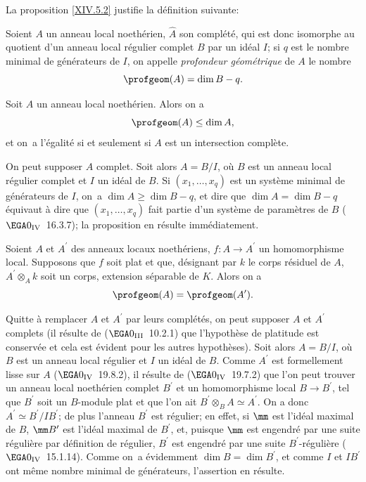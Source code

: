 La proposition \ref{XIV.5.2} justifie la d\'efinition suivante:

\begin{definition} \label{XIV.5.3}
Soient $A$ un anneau local noeth\'erien, $\widehat{A}$ son compl\'et\'e, qui est donc isomorphe au quotient d'un anneau local r\'egulier complet $B$ par un id\'eal $I$; si $q$ est le nombre minimal de g\'en\'erateurs de $I$, on appelle \emph{profondeur géométrique} de $A$ le nombre
$$
\profgeom(A)=\dim B-q.
$$
\end{definition}

\begin{proposition} \label{XIV.5.4} Soit $A$ un anneau local noeth\'erien. Alors on a
$$
\profgeom(A)\leq\dim A,
$$
et on~a l'\'egalit\'e si et seulement si $A$ est un intersection compl\`ete.
\end{proposition}

On peut supposer $A$ complet. Soit alors $A=B/I$, o\`u $B$ est un anneau local r\'egulier complet et $I$ un id\'eal de $B$. Si $(x_{1},\dots, x_{q})$ est un syst\`eme minimal de g\'en\'erateurs de $I$, on~a $\dim A\geq\dim B-q$, et dire que $\dim A=\dim B-q$ \'equivaut \`a dire que $(x_{1},\dots, x_{q})$ fait partie d'un syst\`eme de param\`etres de $B$ ($\EGA 0_{\textup{IV}}$~16.3.7); la proposition en r\'esulte imm\'ediatement.

\begin{proposition} \label{XIV.5.5} Soient $A$ et $A^{\prime}$ des anneaux locaux noeth\'eriens, $f\colon A\to A^{\prime}$ un homomorphisme local. Supposons que $f$ soit plat et que, d\'esignant par $k$ le corps r\'esiduel de $A$, $A^{\prime}\otimes_{A}k$ soit un corps, extension s\'eparable de $K$. Alors on a
$$
\profgeom(A)=\profgeom(A^{\prime}).
$$
\end{proposition}

Quitte \`a remplacer $A$ et $A^{\prime}$ par leurs compl\'et\'es, on peut supposer $A$ et $A^{\prime}$ complets (il r\'esulte de ($\EGA 0_{\textup{III}}$~10.2.1) que l'hypoth\`ese de platitude est conserv\'ee et cela est \'evident pour les autres hypoth\`eses). Soit alors $A=B/I$, o\`u $B$ est un anneau local r\'egulier et $I$ un id\'eal de $B$. Comme $A^{\prime}$ est formellement lisse sur $A$ ($\EGA 0_{\textup{IV}}$~19.8.2), il r\'esulte de ($\EGA 0_{\textup{IV}}$~19.7.2) que l'on peut trouver un anneau local noeth\'erien complet $B^{\prime}$ et un homomorphisme local $B\to B^{\prime}$, tel que $B^{\prime}$ soit un $B$-module plat et que l'on ait $B^{\prime}\otimes_{B}A\simeq A^{\prime}$. On a donc $A^{\prime}\simeq B^{\prime}/IB^{\prime}$; de plus l'anneau $B^{\prime}$ est r\'egulier; en effet, si $\mm$ est l'id\'eal maximal de $B$, $\mm B^{\prime}$ est l'id\'eal maximal de $B^{\prime}$, et, puisque $\mm$ est engendr\'e par une suite r\'eguli\`ere par d\'efinition de \og r\'egulier\fg, $B^{\prime}$ est engendr\'e par une suite $B^{\prime}$-r\'eguli\`ere ($\EGA 0_{\textup{IV}}$~15.1.14). Comme on~a \'evidemment $\dim B=\dim B^{\prime}$, et comme $I$ et $IB^{\prime}$ ont m\^eme nombre minimal de g\'en\'erateurs, l'assertion en r\'esulte.

